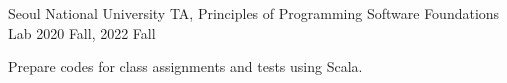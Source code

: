 

\begin{cventries}

  \cventry
  {Seoul National University} %
  {TA, Principles of Programming} %
  {Software Foundations Lab} %
  {2020 Fall, 2022 Fall} %
  {
    \begin{cvitems} %
      \item {Prepare codes for class assignments and tests using Scala.}
    \end{cvitems}
  }

\end{cventries}
